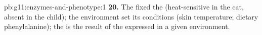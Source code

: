 \begin{solution}{pb:g11:enzymes-and-phenotype:1}
\textbf{20.} The  fixed the  (heat-sensitive in the cat,
absent in the child); the environment set its conditions (skin
temperature; dietary phenylalanine); the  is the result of
the  expressed in a given environment.
\end{solution}
